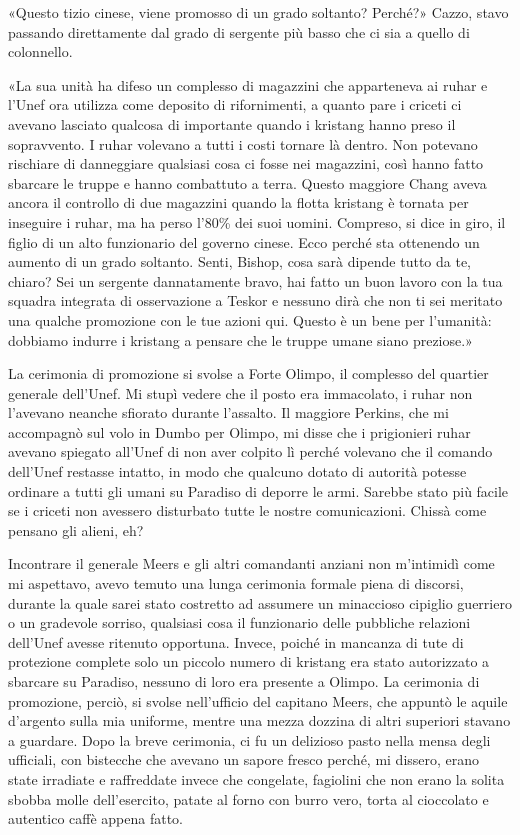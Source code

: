 «Questo tizio cinese, viene promosso di un grado soltanto? Perché?»
Cazzo, stavo passando direttamente dal grado di sergente più basso che
ci sia a quello di colonnello.

«La sua unità ha difeso un complesso di magazzini che apparteneva ai
ruhar e l'Unef ora utilizza come deposito di rifornimenti, a quanto pare
i criceti ci avevano lasciato qualcosa di importante quando i kristang
hanno preso il sopravvento. I ruhar volevano a tutti i costi tornare là
dentro. Non potevano rischiare di danneggiare qualsiasi cosa ci fosse
nei magazzini, così hanno fatto sbarcare le truppe e hanno combattuto a
terra. Questo maggiore Chang aveva ancora il controllo di due magazzini
quando la flotta kristang è tornata per inseguire i ruhar, ma ha perso
l'80\% dei suoi uomini. Compreso, si dice in giro, il figlio di un alto
funzionario del governo cinese. Ecco perché sta ottenendo un aumento di
un grado soltanto. Senti, Bishop, cosa sarà dipende tutto da te, chiaro?
Sei un sergente dannatamente bravo, hai fatto un buon lavoro con la tua
squadra integrata di osservazione a Teskor e nessuno dirà che non ti sei
meritato una qualche promozione con le tue azioni qui. Questo è un bene
per l'umanità: dobbiamo indurre i kristang a pensare che le truppe umane
siano preziose.»

\hfill\break

La cerimonia di promozione si svolse a Forte Olimpo, il complesso del
quartier generale dell'Unef. Mi stupì vedere che il posto era
immacolato, i ruhar non l'avevano neanche sfiorato durante l'assalto. Il
maggiore Perkins, che mi accompagnò sul volo in Dumbo per Olimpo, mi
disse che i prigionieri ruhar avevano spiegato all'Unef di non aver
colpito lì perché volevano che il comando dell'Unef restasse intatto, in
modo che qualcuno dotato di autorità potesse ordinare a tutti gli umani
su Paradiso di deporre le armi. Sarebbe stato più facile se i criceti
non avessero disturbato tutte le nostre comunicazioni. Chissà come
pensano gli alieni, eh?

Incontrare il generale Meers e gli altri comandanti anziani non
m'intimidì come mi aspettavo, avevo temuto una lunga cerimonia formale
piena di discorsi, durante la quale sarei stato costretto ad assumere un
minaccioso cipiglio guerriero o un gradevole sorriso, qualsiasi cosa il
funzionario delle pubbliche relazioni dell'Unef avesse ritenuto
opportuna. Invece, poiché in mancanza di tute di protezione complete
solo un piccolo numero di kristang era stato autorizzato a sbarcare su
Paradiso, nessuno di loro era presente a Olimpo. La cerimonia di
promozione, perciò, si svolse nell'ufficio del capitano Meers, che
appuntò le aquile d'argento sulla mia uniforme, mentre una mezza dozzina
di altri superiori stavano a guardare. Dopo la breve cerimonia, ci fu un
delizioso pasto nella mensa degli ufficiali, con bistecche che avevano
un sapore fresco perché, mi dissero, erano state irradiate e raffreddate
invece che congelate, fagiolini che non erano la solita sbobba molle
dell'esercito, patate al forno con burro vero, torta al cioccolato e
autentico caffè appena fatto.

